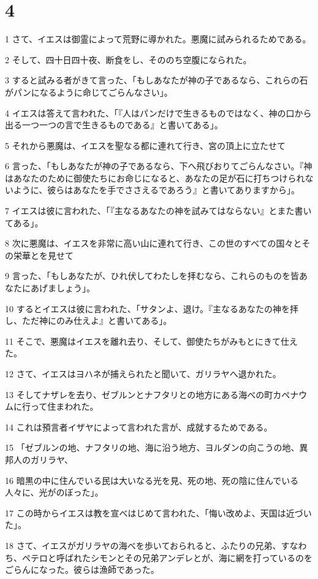\chapter{4}

\par 1 さて、イエスは御霊によって荒野に導かれた。悪魔に試みられるためである。
\par 2 そして、四十日四十夜、断食をし、そののち空腹になられた。
\par 3 すると試みる者がきて言った、「もしあなたが神の子であるなら、これらの石がパンになるように命じてごらんなさい」。
\par 4 イエスは答えて言われた、「『人はパンだけで生きるものではなく、神の口から出る一つ一つの言で生きるものである』と書いてある」。
\par 5 それから悪魔は、イエスを聖なる都に連れて行き、宮の頂上に立たせて
\par 6 言った、「もしあなたが神の子であるなら、下へ飛びおりてごらんなさい。『神はあなたのために御使たちにお命じになると、あなたの足が石に打ちつけられないように、彼らはあなたを手でささえるであろう』と書いてありますから」。
\par 7 イエスは彼に言われた、「『主なるあなたの神を試みてはならない』とまた書いてある」。
\par 8 次に悪魔は、イエスを非常に高い山に連れて行き、この世のすべての国々とその栄華とを見せて
\par 9 言った、「もしあなたが、ひれ伏してわたしを拝むなら、これらのものを皆あなたにあげましょう」。
\par 10 するとイエスは彼に言われた、「サタンよ、退け。『主なるあなたの神を拝し、ただ神にのみ仕えよ』と書いてある」。
\par 11 そこで、悪魔はイエスを離れ去り、そして、御使たちがみもとにきて仕えた。
\par 12 さて、イエスはヨハネが捕えられたと聞いて、ガリラヤへ退かれた。
\par 13 そしてナザレを去り、ゼブルンとナフタリとの地方にある海べの町カペナウムに行って住まわれた。
\par 14 これは預言者イザヤによって言われた言が、成就するためである。
\par 15 「ゼブルンの地、ナフタリの地、海に沿う地方、ヨルダンの向こうの地、異邦人のガリラヤ、
\par 16 暗黒の中に住んでいる民は大いなる光を見、死の地、死の陰に住んでいる人々に、光がのぼった」。
\par 17 この時からイエスは教を宣べはじめて言われた、「悔い改めよ、天国は近づいた」。
\par 18 さて、イエスがガリラヤの海べを歩いておられると、ふたりの兄弟、すなわち、ペテロと呼ばれたシモンとその兄弟アンデレとが、海に網を打っているのをごらんになった。彼らは漁師であった。
